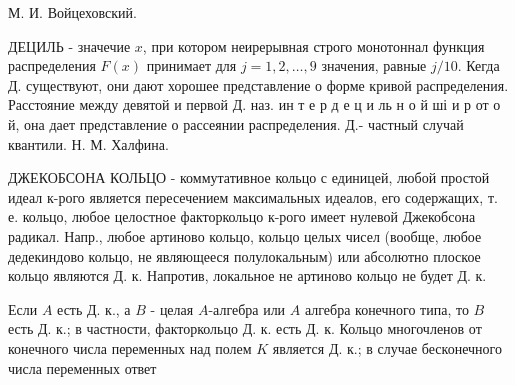 \documentclass[10pt]{article}
\begin{document}
М. И. Войцеховский.



ДЕЦИЛЬ - значечие $x$, при котором неирерывная строго монотоннал функция распределения $F(x)$ принимает для $j=1,2, \ldots, 9$ значения, равные $j / 10$. Кегда Д. существуют, они дают хорошее представление о форме кривой распределения. Расстояние между девятой и первой Д. наз. ин т е р д е ц и ль н о й ші и р от о й, она дает представление о рассеянии распределения. Д.- частный случай квантили. Н. М. Халфина.



ДЖЕКОБСОНА КОЛЬЦО - коммутативное кольцо с единицей, любой простой идеал к-рого является пересечением максимальных идеалов, его содержащих, т. е. кольцо, любое целостное факторкольцо к-рого имеет нулевой Джекобсона радикал. Напр., любое артиново кольцо, кольцо целых чисел (вообще, любое дедекиндово кольцо, не являющееся полулокальным) или абсолютно плоское кольцо являются Д. к. Напротив, локальное не артиново кольцо не будет Д. к.



Если $A$ есть Д. к., а $B$ - целая $A$-алгебра или $A$ алгебра конечного типа, то $B$ есть Д. к.; в частности, факторкольцо Д. к. есть Д. к. Кольцо многочленов от конечного числа переменных над полем $K$ является Д. к.; в случае бесконечного числа переменных ответ
\end{document}
